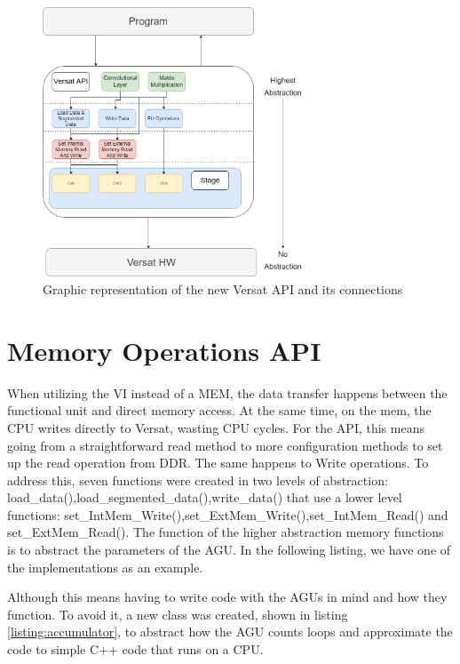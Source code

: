 \begin{figure}[!htbp]
    \centering
    \includegraphics[width=0.7\textwidth]{Figures/VersatMemory.drawio.png}
    \caption{Graphic representation of the new Versat API and its connections}
    \label{newAPI}
\end{figure} 


\section{Memory Operations API}

When utilizing the VI instead of a MEM, the data transfer happens between the functional unit and direct memory access. At the same time,
on the mem, the CPU writes directly to Versat, wasting CPU cycles. For the API, this means going from a straightforward read method
to more configuration methods to set up the read operation from DDR. The same happens to Write operations. To address this, seven functions were created in two levels of abstraction:
load\_data(),load\_segmented\_data(),write\_data() that use a lower level functions: set\_IntMem\_Write(),set\_ExtMem\_Write(),set\_IntMem\_Read() and set\_ExtMem\_Read().
The function of the higher abstraction memory functions is to abstract the parameters of the AGU. In the following listing, we have one of the implementations
as an example.




Although this means having to write code with the AGUs in mind
and how they function. To avoid it, a new class was created, shown in listing \ref*{listing:accumulator},
to abstract how the AGU counts loops and approximate 
the code to simple C++ code that runs on a CPU.

